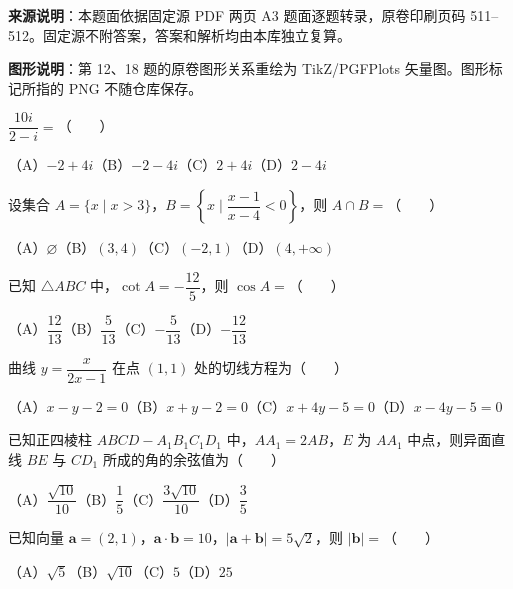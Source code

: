 


\begin{gktip}
\textbf{来源说明}：本题面依据固定源 PDF 两页 A3 题面逐题转录，原卷印刷页码 511–512。固定源不附答案，答案和解析均由本库独立复算。

\textbf{图形说明}：第 12、18 题的原卷图形关系重绘为 TikZ/PGFPlots 矢量图。图形标记所指的 PNG 不随仓库保存。
\end{gktip}


\begin{question}
$\dfrac{10i}{2-i}=$\mbox{（　　）}

（A）$-2+4i$\quad（B）$-2-4i$\quad（C）$2+4i$\quad（D）$2-4i$

\end{question}
\begin{question}
设集合 $A=\{x\mid x>3\}$，$B=\left\{x\mid\dfrac{x-1}{x-4}<0\right\}$，则 $A\cap B=$\mbox{（　　）}

（A）$\varnothing$\quad（B）$(3,4)$\quad（C）$(-2,1)$\quad（D）$(4,+\infty)$

\end{question}
\begin{question}
已知 $\triangle ABC$ 中，$\cot A=-\dfrac{12}{5}$，则 $\cos A=$\mbox{（　　）}

（A）$\dfrac{12}{13}$\quad（B）$\dfrac5{13}$\quad（C）$-\dfrac5{13}$\quad（D）$-\dfrac{12}{13}$

\end{question}
\begin{question}
曲线 $y=\dfrac{x}{2x-1}$ 在点 $(1,1)$ 处的切线方程为\mbox{（　　）}

（A）$x-y-2=0$\quad（B）$x+y-2=0$\quad（C）$x+4y-5=0$\quad（D）$x-4y-5=0$

\end{question}
\begin{question}
已知正四棱柱 $ABCD-A_1B_1C_1D_1$ 中，$AA_1=2AB$，$E$ 为 $AA_1$ 中点，则异面直线 $BE$ 与 $CD_1$ 所成的角的余弦值为\mbox{（　　）}

（A）$\dfrac{\sqrt{10}}{10}$\quad（B）$\dfrac15$\quad（C）$\dfrac{3\sqrt{10}}{10}$\quad（D）$\dfrac35$

\end{question}
\begin{question}
已知向量 $\boldsymbol a=(2,1)$，$\boldsymbol a\cdot\boldsymbol b=10$，$|\boldsymbol a+\boldsymbol b|=5\sqrt2$，则 $|\boldsymbol b|=$\mbox{（　　）}

（A）$\sqrt5$\quad（B）$\sqrt{10}$\quad（C）$5$\quad（D）$25$

\end{question}
